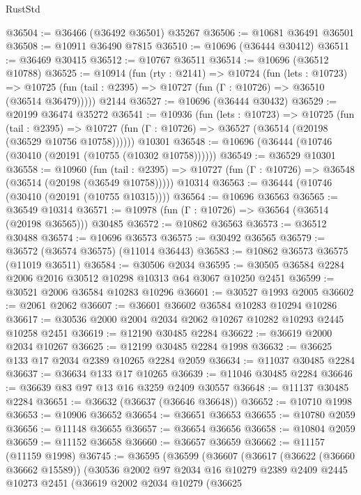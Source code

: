 \begin{lexlean}{RustStd}
\begin{coremodule}
@36504 := @36466 (@36492 @36501) @35267
@36506 := @10681 @36491 @36501
@36508 := @10911 @36490 @7815
@36510 := @10696 (@36444 @30412)
@36511 := @36469 @30415
@36512 := @10767 @36511
@36514 := @10696 (@36512 @10788)
@36525 := @10914
    (fun (rty : @2141) =>
    @10724
      (fun (lets : @10723) =>
      @10725 (fun (tail : @2395) => @10727 (fun (Γ : @10726) => @36510 (@36514 @36479)))))
    @2144
@36527 := @10696 (@36444 @30432)
@36529 := @20199 @36474 @35272
@36541 := @10936
    (fun (lets : @10723) =>
    @10725
      (fun (tail : @2395) =>
      @10727 (fun (Γ : @10726) => @36527 (@36514 (@20198 (@36529 @10756 @10758))))))
    @10301
@36548 := @10696 (@36444 (@10746 (@30410 (@20191 (@10755 (@10302 @10758))))))
@36549 := @36529 @10301
@36558 := @10960
    (fun (tail : @2395) => @10727 (fun (Γ : @10726) => @36548 (@36514 (@20198 (@36549 @10758)))))
    @10314
@36563 := @36444 (@10746 (@30410 (@20191 (@10755 @10315))))
@36564 := @10696 @36563
@36565 := @36549 @10314
@36571 := @10978 (fun (Γ : @10726) => @36564 (@36514 (@20198 @36565))) @30485
@36572 := @10862 @36563
@36573 := @36512 @30488
@36574 := @10696 @36573
@36575 := @30492 @36565
@36579 := @36572 (@36574 @36575) (@11014 @36443)
@36583 := @10862 @36573 @36575 (@11019 @36511)
@36584 := @30506 @2034
@36595 := @30505 @36584 @2284 @2006 @2016 @30512 @10298 @10313 @64 @3067 @10250 @2451
@36599 := @30521 @2006 @36584 @10283 @10296
@36601 := @30527 @1993 @2005
@36602 := @2061 @2062
@36607 := @36601 @36602 @36584 @10283 @10294 @10286
@36617 := @30536 @2000 @2004 @2034 @2062 @10267 @10282 @10293 @2445 @10258 @2451
@36619 := @12190 @30485 @2284
@36622 := @36619 @2000 @2034 @10267
@36625 := @12199 @30485 @2284 @1998
@36632 := @36625 @133 @17 @2034 @2389 @10265 @2284 @2059
@36634 := @11037 @30485 @2284
@36637 := @36634 @133 @17 @10265
@36639 := @11046 @30485 @2284
@36646 := @36639 @83 @97 @13 @16 @3259 @2409 @30557
@36648 := @11137 @30485 @2284
@36651 := @36632 (@36637 (@36646 @36648))
@36652 := @10710 @1998
@36653 := @10906 @36652
@36654 := @36651 @36653
@36655 := @10780 @2059
@36656 := @11148 @36655
@36657 := @36654 @36656
@36658 := @10804 @2059
@36659 := @11152 @36658
@36660 := @36657 @36659
@36662 := @11157 (@11159 @1998)
@36745 := @36595
    (@36599
      (@36607
        (@36617
          (@36622 (@36660 @36662 @15589))
          (@30536
            @2002
            @97
            @2034
            @16
            @10279
            @2389
            @2409
            @2445
            @10273
            @2451
            (@36619
              @2002
              @2034
              @10279
              (@36625

\end{coremodule}
\end{lexlean}
